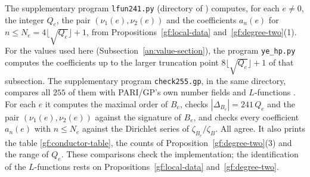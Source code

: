 \begin{remark}\label{gf:checks}
The supplementary program \texttt{lfun241.py} (directory
 of \cite{NaslundCode4317}) computes, for
each $e\ne0$, the integer $Q_e$, the pair $(\nu_1(e),\nu_2(e))$ and the
coefficients $a_n(e)$ for $n\le N_e=4\lfloor\sqrt{Q_e}\rfloor+1$, from
Propositions~\ref{gf:local-data} and~\ref{gf:degree-two}(1). For the values used here
(Subsection~\ref{an:value-section}), the program \texttt{ye\_hp.py} computes
the coefficients up to the larger truncation point
$8\lfloor\sqrt{Q_e}\rfloor+1$ of that subsection. The supplementary program
\texttt{check255.gp}, in the same directory, compares all $255$ of them with PARI/GP's own number
fields and $L$-functions \cite{PARI}. For each $e$ it computes the maximal
order of $B_e$, checks $|\Delta_{B_e}|=241\,Q_e$ and the pair
$(\nu_1(e),\nu_2(e))$ against the signature of $B_e$, and checks every
coefficient $a_n(e)$ with $n\le N_e$
against the Dirichlet series of $\zeta_{B_e}/\zeta_B$. All agree. It also
prints the table \eqref{gf:conductor-table}, the counts of
Proposition~\ref{gf:degree-two}(3) and the range of $Q_e$. These comparisons
check the implementation; the identification of the $L$-functions rests on
Propositions~\ref{gf:local-data} and~\ref{gf:degree-two}.
\end{remark}
